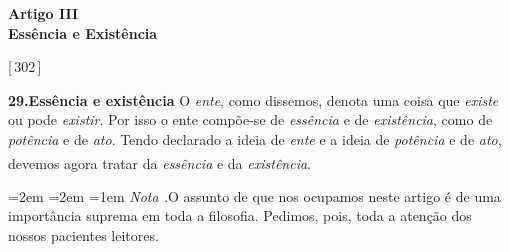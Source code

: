 \documentclass[12pt,a4paper]{article}
\newcommand{\pg}[1]{\thinspace\textup{[\,#1\,]}\thinspace}
\newcommand{\tese}[2]{\bigskip\noindent\textbf{#1.\quad #2}\;\textemdash\;}
\renewcommand\footnote[1]{%
    \stepcounter{footnote}\textsuperscript{\thefootnote}%
    \par
    {\footnotesize
     \leftskip=2em \rightskip=2em \parindent=1em
     \addvspace{\medskipamount}%
     \noindent\textit{Nota \thefootnote.}\enspace #1\par
     \addvspace{\medskipamount}}%
  }
\begin{document}
\begin{center}
  {\large\textbf{Artigo III}}\\[0.4em]
  {\large\textbf{Essência e Existência}}
\end{center}

\vspace{1.5em}

\pg{302}

\tese{29}{Essência e existência} O \emph{ente}, como dissemos, denota uma coisa
que \emph{existe} ou pode \emph{existir}. Por isso o ente compõe-se de
\emph{essência} e de \emph{existência}, como de \emph{potência} e de
\emph{ato}. \textemdash{} Tendo declarado a ideia de \emph{ente} e a ideia de
\emph{potência} e de \emph{ato}, devemos agora tratar da \emph{essência} e da
\emph{existência}.\footnote{O assunto de que nos ocupamos neste artigo é de uma
importância suprema em toda a filosofia. Pedimos, pois, toda a atenção dos
nossos pacientes leitores.}
\end{document}
